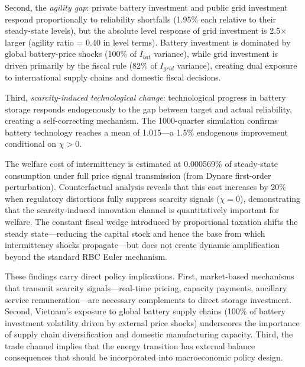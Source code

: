 \documentclass[12pt, a4paper]{article}
\begin{document}
Second, the \textit{agility gap}: private battery investment and public grid investment respond proportionally to reliability shortfalls (1.95\% each relative to their steady-state levels), but the absolute level response of grid investment is 2.5$\times$ larger (agility ratio = 0.40 in level terms). Battery investment is dominated by global battery-price shocks (100\% of $I_{bat}$ variance), while grid investment is driven primarily by the fiscal rule (82\% of $I_{grid}$ variance), creating dual exposure to international supply chains and domestic fiscal decisions.

Third, \textit{scarcity-induced technological change}: technological progress in battery storage responds endogenously to the gap between target and actual reliability, creating a self-correcting mechanism. The 1000-quarter simulation confirms battery technology reaches a mean of 1.015---a 1.5\% endogenous improvement conditional on $\chi > 0$.

The welfare cost of intermittency is estimated at 0.000569\% of steady-state consumption under full price signal transmission (from Dynare first-order perturbation). Counterfactual analysis reveals that this cost increases by 20\% when regulatory distortions fully suppress scarcity signals ($\chi = 0$), demonstrating that the scarcity-induced innovation channel is quantitatively important for welfare. The constant fiscal wedge introduced by proportional taxation shifts the steady state---reducing the capital stock and hence the base from which intermittency shocks propagate---but does not create dynamic amplification beyond the standard RBC Euler mechanism.

These findings carry direct policy implications. First, market-based mechanisms that transmit scarcity signals---real-time pricing, capacity payments, ancillary service remuneration---are necessary complements to direct storage investment. Second, Vietnam's exposure to global battery supply chains (100\% of battery investment volatility driven by external price shocks) underscores the importance of supply chain diversification and domestic manufacturing capacity. Third, the trade channel implies that the energy transition has external balance consequences that should be incorporated into macroeconomic policy design.
\end{document}
